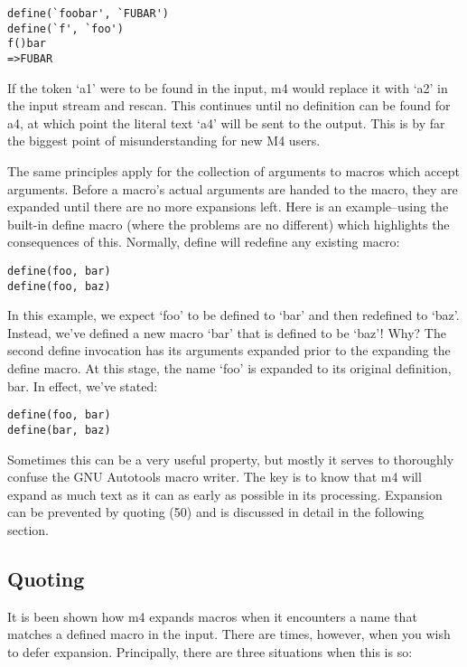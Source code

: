  	

\begin{verbatim}
define(`foobar', `FUBAR')
define(`f', `foo')
f()bar
=>FUBAR
\end{verbatim}

If the token `a1' were to be found in the input, m4 would replace it with `a2' in the input stream and rescan. This continues until no definition can be found for a4, at which point the literal text `a4' will be sent to the output. This is by far the biggest point of misunderstanding for new M4 users.

The same principles apply for the collection of arguments to macros which accept arguments. Before a macro's actual arguments are handed to the macro, they are expanded until there are no more expansions left. Here is an example--using the built-in define macro (where the problems are no different) which highlights the consequences of this. Normally, define will redefine any existing macro:

 	

\begin{verbatim}
define(foo, bar)
define(foo, baz)
\end{verbatim}

In this example, we expect `foo' to be defined to `bar' and then redefined to `baz'. Instead, we've defined a new macro `bar' that is defined to be `baz'! Why? The second define invocation has its arguments expanded prior to the expanding the define macro. At this stage, the name `foo' is expanded to its original definition, bar. In effect, we've stated:

 	

\begin{verbatim}
define(foo, bar)
define(bar, baz)
\end{verbatim}

Sometimes this can be a very useful property, but mostly it serves to thoroughly confuse the GNU Autotools macro writer. The key is to know that m4 will expand as much text as it can as early as possible in its processing. Expansion can be prevented by quoting (50) and is discussed in detail in the following section. 

\subsection{Quoting}\label{S_Quoting}

It is been shown how m4 expands macros when it encounters a name that matches a defined macro in the input. There are times, however, when you wish to defer expansion. Principally, there are three situations when this is so:

